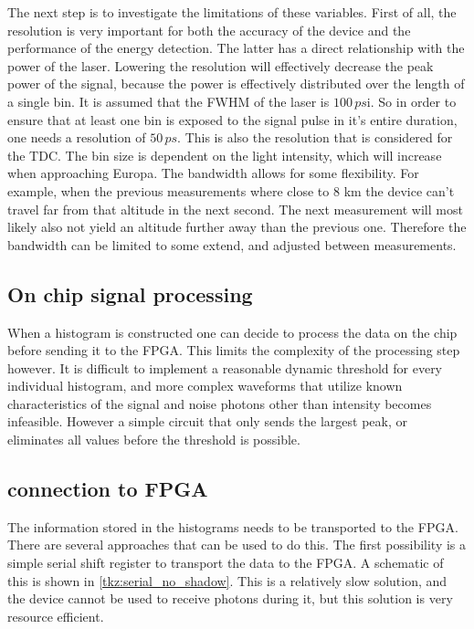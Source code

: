 The next step is to investigate the limitations of these variables. First of all, the resolution is very important for both the accuracy of the device and the performance of the energy detection. The latter has a direct relationship with the power of the laser. Lowering the resolution will effectively decrease the peak power of the signal, because the power is effectively distributed over the length of a single bin. It is assumed that the FWHM of the laser is $100\,ps$i. So in order to ensure that at least one bin is exposed to the signal pulse in it's entire duration, one needs a resolution of $50\,ps$. This is also the resolution that is considered for the TDC. The bin size is dependent on the light intensity, which will increase when approaching Europa. The bandwidth allows for some flexibility. For example, when the previous measurements where close to 8 km the device can't travel far from that altitude in the next second. The next measurement will most likely also not yield an altitude further away than the previous one. Therefore the bandwidth can be limited to some extend, and adjusted between measurements.

\subsection{On chip signal processing}
When a histogram is constructed one can decide to process the data on the chip before sending it to the FPGA. This limits the complexity of the processing step however. It is difficult to implement a reasonable dynamic threshold for every individual histogram, and more complex waveforms that utilize known characteristics of the signal and noise photons other than intensity becomes infeasible. However a simple circuit that only sends the largest peak, or eliminates all values before the threshold is possible. 

\subsection{connection to FPGA}
The information stored in the histograms needs to be transported to the FPGA. There are several approaches that can be used to do this. The first possibility is a simple serial shift register to transport the data to the FPGA. A schematic of this is shown in \cref{tkz:serial_no_shadow}. This is a relatively slow solution, and the device cannot be used to receive photons during it, but this solution is very resource efficient.



